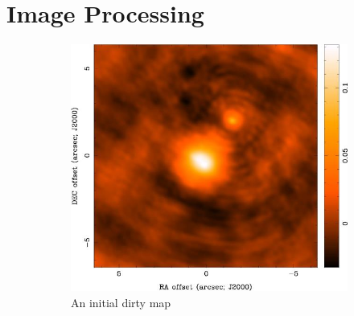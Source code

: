 
\chapter{Image Processing} %

\label{Chapter4} %



\begin{figure}[h]
        \centering
        \begin{subfigure}[b]{0.5\textwidth}
                \includegraphics[width=\textwidth]{Figures/dirty}
                \caption{An initial dirty map}
                \label{fig:noWeightDirty}
        \end{subfigure}%
        ~ %
        \begin{subfigure}[b]{0.5\textwidth}

\end{subfigure}
\end{figure}
